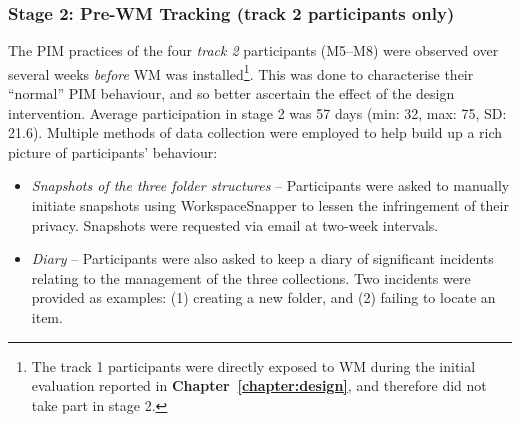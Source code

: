 \subsubsection{Stage 2: Pre-WM Tracking (track 2 participants only)}
The PIM practices of the four \textit{track 2} participants (M5--M8) were observed over several weeks \textit{before} WM was installed\footnote{The track 1 participants were directly exposed to WM during the initial evaluation reported in \textbf{Chapter~\ref{chapter:design}}, and therefore did not take part in stage 2.}.  This was done to characterise their ``normal'' PIM behaviour, and so better ascertain the effect of the design intervention. Average participation in stage 2 was 57 days (min: 32, max: 75, SD: 21.6).  Multiple methods of data collection were employed to help build up a rich picture of participants' behaviour:

\begin{itemize}
\item \textit{Snapshots of the three folder structures} -- Participants were asked to manually initiate snapshots using WorkspaceSnapper to lessen the infringement of their privacy.  Snapshots were requested via email at two-week intervals. %

\item \textit{Diary} -- Participants were also asked to keep a diary of significant incidents relating to the management of the three collections. Two incidents were provided as examples: (1) creating a new folder, and (2) failing to locate an item.  %

\end{itemize}
















